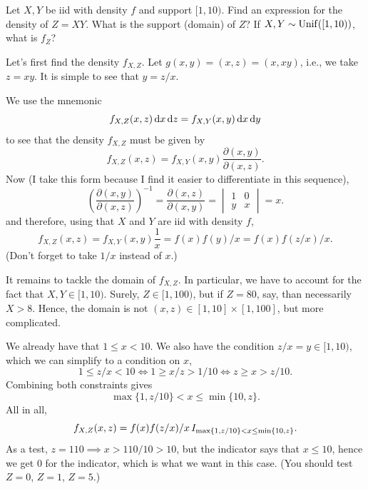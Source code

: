 \documentclass[lectures]{subfiles}
\begin{document}
\begin{exercise}
Let $X,Y$ be iid with density $f$ and support $[1,10)$. Find an expression for the density of $Z=X Y$. What is the support (domain) of $Z$? If $X,Y\sim\mathrm{Unif}([1,10))$, what is $f_{Z}$?
\begin{solution}
Let's first find the density $f_{X,Z}$.
Let $g(x,y) = (x, z) = (x, x y)$, i.e., we take $z=x y$. It is simple to see that $y=z/x$.

We use the mnemonic
\begin{equation}
\label{eq:20}
f_{X,Z}(x,z) \,\textrm{d}x \,\textrm{d}z =
f_{X,Y}(x,y) \,\textrm{d}x \,\textrm{d}y
\end{equation}
to see that the density $f_{X,Z}$ must be given by
\begin{equation}
f_{X,Z}(x,z)  = f_{X,Y}(x,y) \frac{\partial(x,y)}{\partial(x, z)}.
\end{equation}
Now (I take this form because I find it easier to differentiate in this sequence),
\begin{equation}
\label{eq:19}
\left(\frac{\partial(x,y)}{\partial(x,z)}\right)^{-1} =
\frac{\partial(x,z)}{\partial(x,y)} =
\begin{vmatrix}
  1 & 0 \\
y & x
\end{vmatrix} = x.
\end{equation}
and therefore, using that $X$ and $Y$ are iid with density $f$,
\begin{equation}
f_{X,Z}(x,z)  = f_{X,Y}(x,y) \frac{1}{x} = f(x)f(y)/x = f(x)f(z/x)/ x.
\end{equation}
(Don't forget to take $1/x$ instead of $x$.)

It remains to tackle the domain of $f_{X,Z}$.
In particular, we have to account for the fact that $X, Y\in [1,10)$.
Surely, $Z\in [1, 100)$, but if $Z=80$, say, than necessarily $X>8$.
Hence, the domain is not $(x,z) \in [1,10]\times [1, 100]$, but more complicated.

We already have that $1\leq x < 10$. We also have the condition $z/x = y\in [1, 10)$, which we can simplify to a condition on $x$,
\begin{equation}
\label{eq:22}
1\leq z/x < 10 \iff 1 \geq x/z > 1/10 \iff z \geq x > z/10.
\end{equation}
Combining both constraints gives
\begin{equation}
\max\{1, z/10\} < x \leq \min\{10, z\}.
\end{equation}
All in all,
\begin{equation}
f_{X,Z}(x,z)  = f(x)f(z/x)/ x \,I_{\max\{1, z/10\}< x \leq \min\{10, z\}}.
\end{equation}
As a test, $z=110 \implies x > 110/10 > 10$, but the indicator says that $x\leq 10$, hence we get 0 for the indicator, which is what we want in this case. (You should test $Z=0$, $Z=1$, $Z=5$.)


\end{solution}
\end{exercise}
\end{document}

